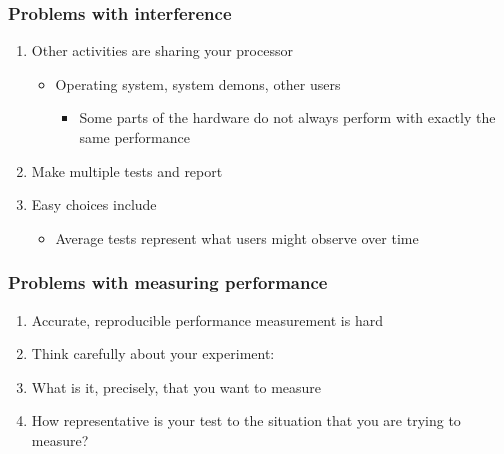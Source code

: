 \documentclass{beamer}
\begin{document}
\begin{frame}
\frametitle{Problems with interference}

\begin{enumerate}
\item Other activities are sharing your processor
\begin{itemize}

  \item Operating system, system demons, other users
\begin{itemize}

   \item Some parts of the hardware do not always perform with exactly the same performance

\end{itemize}

\noindent
\end{itemize}

\noindent
\item Make multiple tests and report

\item Easy choices include
\begin{itemize}

  \item Average tests represent what users might observe over time
\end{itemize}

\noindent
\end{enumerate}

\noindent
\end{frame}

\begin{frame}
\frametitle{Problems with measuring performance}

\begin{enumerate}
\item Accurate, reproducible performance measurement is hard

\item Think carefully about your experiment:

\item What is it, precisely, that you want to measure

\item How representative is your test to the situation that you are trying to measure?
\end{enumerate}

\noindent
\end{frame}
\end{document}
